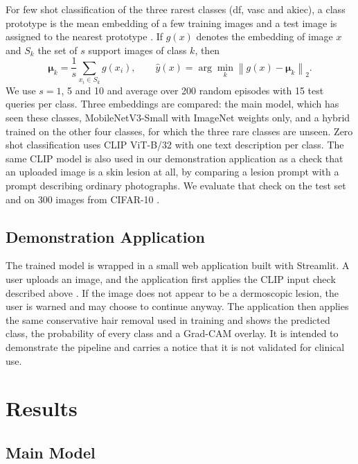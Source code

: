 \documentclass[runningheads]{llncs}
\begin{document}
For few shot classification of the three rarest classes (df, vasc and akiec), a class prototype is the mean embedding of a few training images and a test image is assigned to the nearest prototype \cite{snell2017}. If $g(x)$ denotes the embedding of image $x$ and $S_k$ the set of $s$ support images of class $k$, then
\begin{equation}
\boldsymbol{\mu}_k = \frac{1}{s} \sum_{x_i \in S_k} g(x_i), \qquad \hat{y}(x) = \arg\min_{k} \left\lVert g(x) - \boldsymbol{\mu}_k \right\rVert_2 .
\label{eq:proto}
\end{equation}
We use $s = 1$, 5 and 10 and average over 200 random episodes with 15 test queries per class. Three embeddings are compared: the main model, which has seen these classes, MobileNetV3-Small with ImageNet weights only, and a hybrid trained on the other four classes, for which the three rare classes are unseen. Zero shot classification uses CLIP ViT-B/32 \cite{radford2021} with one text description per class. The same CLIP model is also used in our demonstration application as a check that an uploaded image is a skin lesion at all, by comparing a lesion prompt with a prompt describing ordinary photographs. We evaluate that check on the test set and on 300 images from CIFAR-10 \cite{krizhevsky2009}.

\subsection{Demonstration Application}

The trained model is wrapped in a small web application built with Streamlit. A user uploads an image, and the application first applies the CLIP input check described above \cite{radford2021}. If the image does not appear to be a dermoscopic lesion, the user is warned and may choose to continue anyway. The application then applies the same conservative hair removal used in training and shows the predicted class, the probability of every class and a Grad-CAM overlay. It is intended to demonstrate the pipeline and carries a notice that it is not validated for clinical use.

\section{Results}

\subsection{Main Model}
\end{document}
